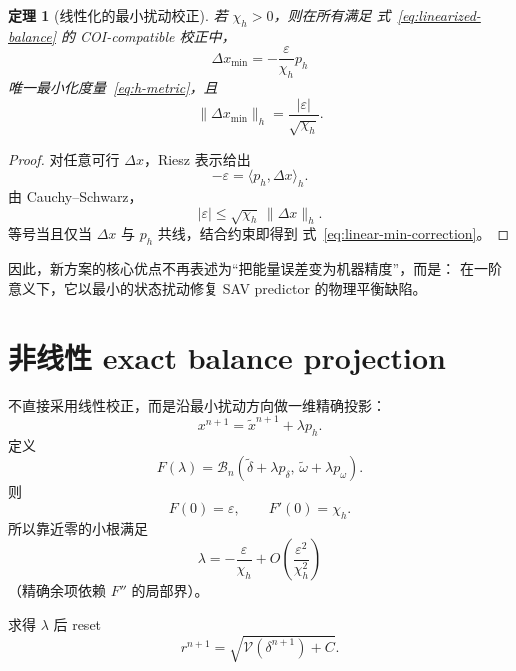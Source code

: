 \documentclass[UTF8,11pt,a4paper]{ctexart}
\newtheorem{theorem}{定理}[section]
\theoremstyle{definition}
\theoremstyle{remark}
\newcommand{\V}{\mathcal V}
\newcommand{\B}{\mathcal B}
\newcommand{\wt}{\widetilde}
\begin{document}
\begin{theorem}[线性化的最小扰动校正]
若 \(\chi_h>0\)，则在所有满足
式~\eqref{eq:linearized-balance} 的 COI-compatible 校正中，
\begin{equation}
 \boxed{
 \Delta x_{\min}
 =
 -\frac{\varepsilon}{\chi_h}p_h}
 \label{eq:linear-min-correction}
\end{equation}
唯一最小化度量~\eqref{eq:h-metric}，且
\begin{equation}
 \boxed{
 \|\Delta x_{\min}\|_h
 =
 \frac{|\varepsilon|}{\sqrt{\chi_h}}.}
 \label{eq:min-bound}
\end{equation}
\end{theorem}

\begin{proof}
对任意可行 \(\Delta x\)，Riesz 表示给出
\[
 -\varepsilon
 =
 \langle p_h,\Delta x\rangle_h.
\]
由 Cauchy--Schwarz，
\[
 |\varepsilon|
 \le
 \sqrt{\chi_h}\,\|\Delta x\|_h.
\]
等号当且仅当 \(\Delta x\) 与 \(p_h\) 共线，结合约束即得到
式~\eqref{eq:linear-min-correction}。
\end{proof}

因此，新方案的核心优点不再表述为“把能量误差变为机器精度”，而是：
在一阶意义下，它以最小的状态扰动修复 SAV predictor 的物理平衡缺陷。

\section{非线性 exact balance projection}

不直接采用线性校正，而是沿最小扰动方向做一维精确投影：
\begin{equation}
 x^{n+1}
 =
 \wt x^{n+1}+\lambda p_h.
 \label{eq:nonlinear-projection}
\end{equation}
定义
\begin{equation}
 F(\lambda)
 =
 \B_n(
 \wt\delta+\lambda p_\delta,\,
 \wt\omega+\lambda p_\omega).
 \label{eq:F}
\end{equation}
则
\begin{equation}
 F(0)=\varepsilon,
 \qquad
 F'(0)=\chi_h.
 \label{eq:F0}
\end{equation}
所以靠近零的小根满足
\begin{equation}
 \boxed{
 \lambda
 =
 -\frac{\varepsilon}{\chi_h}
 +O\!\left(
 \frac{\varepsilon^2}{\chi_h^2}
 \right)}
 \label{eq:lambda-asymptotic}
\end{equation}
（精确余项依赖 \(F''\) 的局部界）。

求得 \(\lambda\) 后 reset
\begin{equation}
 r^{n+1}
 =
 \sqrt{\V(\delta^{n+1})+C}.
 \label{eq:r-reset}
\end{equation}
\end{document}
